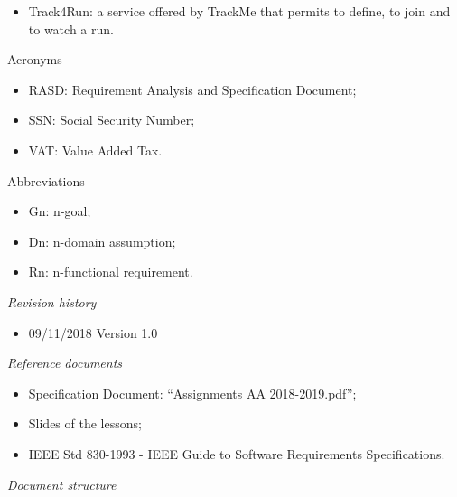 \documentclass{article}
\begin{document}
\begin{legal}
\begin{legal}
\begin{legal}
{\begin{itemize}
				\item Track4Run: a service offered by TrackMe that permits to define, to join and to watch a run.\\
				\end{itemize}
			}	
			\item Acronyms\\
			{\normalfont	
				\begin{itemize}
				\item RASD: Requirement Analysis and Specification Document;\\
				\item SSN: Social Security Number;\\
				\item VAT: Value Added Tax.\\
				\end{itemize}
			}
			\item Abbreviations\\
			{\normalfont	
				\begin{itemize}
				\item Gn: n-goal;\\
				\item Dn: n-domain assumption;\\
				\item Rn: n-functional requirement.\\
				\end{itemize}
			}
			\end{legal}
		\item \textit{Revision history}\\
		{\normalfont
			\begin{itemize}
			\item 09/11/2018		Version 1.0\\
			\end{itemize}
		}
		\item \textit{Reference documents}\\
		{\normalfont	
			\begin{itemize}
			\item Specification Document: “Assignments AA 2018-2019.pdf”;\\
			\item Slides of the lessons;\\
			\item IEEE Std 830-1993 - IEEE Guide to Software Requirements Specifications.\\
			\end{itemize}
		}
		\item \textit{Document structure}\\

\end{legal}
\end{legal}
\end{document}
